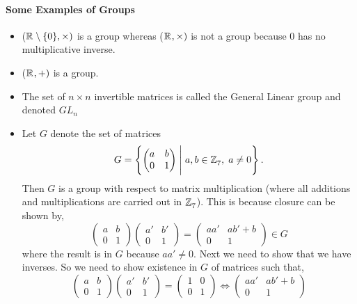\documentclass[MathsNotesBase.tex]{subfiles}
\begin{document}
{	\paragraph*{Some Examples of Groups}
	\begin{itemize}
	\item{ ($\mathbb{R}^{} \setminus \{0\}, \times)$ } is a group whereas ($\mathbb{R}^{}, \times)$ is not a group because $0$ has no multiplicative inverse.
	\item{ ($\mathbb{R}^{}, +)$ } is a group.
	\item{ The set of $n \times n$ invertible matrices is called the General Linear group and denoted $GL_n$  }
	\item{Let $G$ denote the set of matrices
		\[ G = \left\{
			\begin{pmatrix}
				a & b \\
				0 & 1
			\end{pmatrix}
		\; \middle\vert \; a,b \in \mathbb{Z}^{}_7, \; a \neq 0 \right\}. \]
		Then $G$ is a group with respect to matrix multiplication (where all additions and multiplications are carried out in $\mathbb{Z}^{}_7$). This is because closure can be shown by,
		\[
			\begin{pmatrix}
			a & b \\
			0 & 1
			\end{pmatrix}
			\begin{pmatrix}
			a' & b' \\
			0 & 1
			\end{pmatrix}
			=
			\begin{pmatrix}
			aa' & ab' + b \\
			0 & 1
			\end{pmatrix} \in G
		\]
		where the result is in $G$ because ${ aa' \neq 0 }$. Next we need to show that we have inverses. So we need to show existence in $G$ of matrices such that,
		\[
			\begin{pmatrix}
			a & b \\
			0 & 1
			\end{pmatrix}
			\begin{pmatrix}
			a' & b' \\
			0 & 1
			\end{pmatrix}
			=
			\begin{pmatrix}
			1 & 0 \\
			0 & 1
			\end{pmatrix} 
			\iff
			\begin{pmatrix}
			aa' & ab' + b \\
			0 & 1
			\end{pmatrix}
\]}
\end{itemize}}
\end{document}
